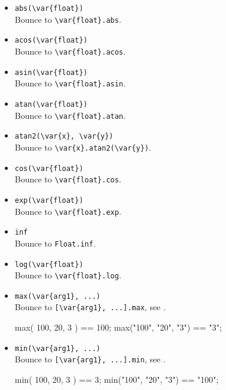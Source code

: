 \begin{itemize}
\item \lstinline|abs(\var{float})|\\
  Bounce to \lstinline|\var{float}.abs|.

\item \lstinline|acos(\var{float})|\\
  Bounce to \lstinline|\var{float}.acos|.

\item \lstinline|asin(\var{float})|\\
  Bounce to \lstinline|\var{float}.asin|.

\item \lstinline|atan(\var{float})|\\
  Bounce to \lstinline|\var{float}.atan|.

\item \lstinline|atan2(\var{x}, \var{y})|\\
  Bounce to \lstinline|\var{x}.atan2(\var{y})|.

\item \lstinline|cos(\var{float})|\\
  Bounce to \lstinline|\var{float}.cos|.

\item \lstinline|exp(\var{float})|\\
  Bounce to \lstinline|\var{float}.exp|.

\item \lstinline|inf|\\
  Bounce to \lstinline|Float.inf|.

\item \lstinline|log(\var{float})|\\
  Bounce to \lstinline|\var{float}.log|.

\item \lstinline|max(\var{arg1}, ...)|\\
  Bounce to \lstinline|[\var{arg1}, ...].max|, see .
\begin{urbiassert}
max( 100,   20,   3 ) == 100;
max("100", "20", "3") == "3";
\end{urbiassert}

\item \lstinline|min(\var{arg1}, ...)|\\
  Bounce to \lstinline|[\var{arg1}, ...].min|, see .
\begin{urbiassert}[firstnumber=last]
min( 100,   20,   3 ) ==     3;
min("100", "20", "3") == "100";
\end{urbiassert}


\end{itemize}
